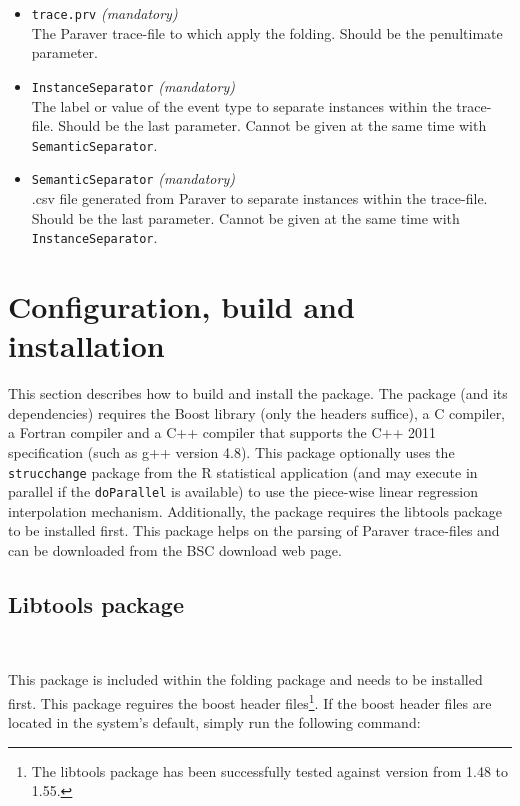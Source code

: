 \begin{itemize}
	\item \texttt{trace.prv} \textit{(mandatory)}\\
	The Paraver trace-file to which apply the folding. Should be the penultimate parameter.

	\item \texttt{InstanceSeparator} \textit{(mandatory)}\\
	The label or value of the event type to separate instances within the trace-file. Should be the last parameter. Cannot be given at the same time with \texttt{SemanticSeparator}.

	\item \texttt{SemanticSeparator} \textit{(mandatory)}\\
	.csv file generated from Paraver to separate instances within the trace-file. Should be the last parameter. Cannot be given at the same time with \texttt{InstanceSeparator}.
	
\end{itemize}

\section{Configuration, build and installation}

This section describes how to build and install the \FOLDING package.
The \FOLDING package (and its dependencies) requires the Boost library (only the headers suffice), a C compiler, a Fortran compiler and a C++ compiler that supports the C++ 2011 specification (such as g++ version 4.8).
This package optionally uses the \texttt{strucchange} package from the R statistical application (and may execute in parallel if the \texttt{doParallel} is available) to use the piece-wise linear regression interpolation mechanism.
Additionally, the \FOLDING package requires the libtools package to be installed first.
This package helps on the parsing of Paraver trace-files and can be downloaded from the BSC download web page.

\subsection{Libtools package}~\label{subsec:LibtoolsInstallation}

This package is included within the folding package and needs to be installed first.
This package reguires the boost header files\footnote{The libtools package has been successfully tested against version from 1.48 to 1.55.}.
If the boost header files are located in the system's default, simply run the following command:

